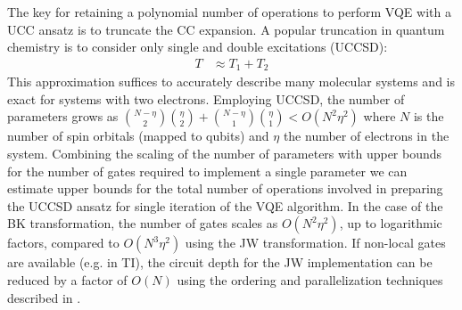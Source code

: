 \documentclass[superscriptaddress,aps,pra,twocolumn,nofootinbib,babel]{revtex4-1}
\begin{document}
The key for retaining a polynomial number of operations to perform VQE with a UCC ansatz is to truncate the CC expansion. A popular truncation in quantum chemistry is to consider only single and double excitations (UCCSD):
\begin{align}
T&\approx T_1+T_2
\end{align}
This approximation suffices to accurately describe many molecular systems and is exact for systems with two electrons. Employing UCCSD, the number of parameters grows as ${N-\eta \choose 2} {\eta \choose 2}+{N-\eta \choose 1} {\eta \choose 1}<O(N^2\eta^2)$ where $N$ is the number of spin orbitals (mapped to qubits) and $\eta$ the number of electrons in the system. Combining the scaling of the number of parameters with upper bounds for the number of gates required to implement a single parameter we can estimate upper bounds for the total number of operations involved in preparing the UCCSD ansatz for single iteration of the VQE algorithm. In the case of the BK transformation, the number of gates scales as $O(N^2\eta^2)$, up to logarithmic factors, compared to $O(N^3\eta^2)$ using the JW transformation. If non-local gates are available (e.g. in TI), the circuit depth for the JW implementation can be reduced by a factor of $O(N)$ using the ordering and parallelization techniques described in \cite{Hastings.IQA.2685188.2015}.
\end{document}
